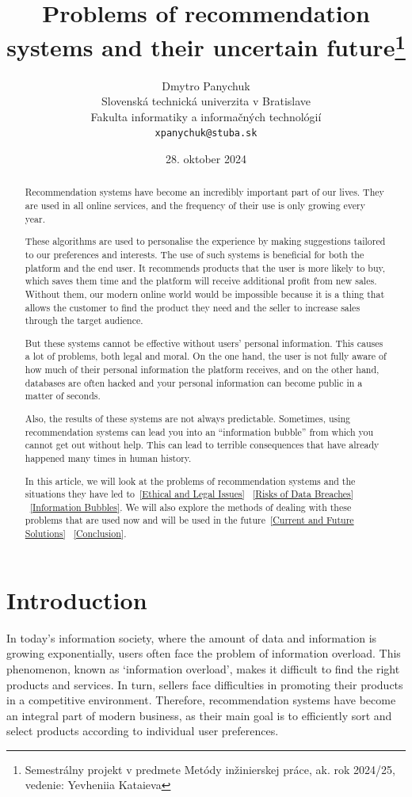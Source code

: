 \documentclass[10pt,twoside,slovak,a4paper]{article}
\title{Problems of recommendation systems and their uncertain future\thanks{Semestrálny projekt v predmete Metódy inžinierskej práce, ak. rok 2024/25, vedenie: Yevheniia Kataieva }}
\author{Dmytro Panychuk\\[2pt]
	{\small Slovenská technická univerzita v Bratislave}\\
	{\small Fakulta informatiky a informačných technológií}\\
	{\small \texttt{xpanychuk@stuba.sk}}
	}
\date{\small 28. oktober 2024}
\begin{document}
\maketitle

\begin{abstract}
\centering


Recommendation systems have become an incredibly important part of our lives. They are used in all online services, and the frequency of their use is only growing every year. 

These algorithms are used to personalise the experience by making suggestions tailored to our preferences and interests\cite{experience}. The use of such systems is beneficial for both the platform and the end user. It recommends products that the user is more likely to buy, which saves them time and the platform will receive additional profit from new sales\cite{comerce}.  Without them, our modern online world would be impossible because it is a thing that allows the customer to find the product they need and the seller to increase sales through the target audience.

But these systems cannot be effective without users' personal information. This causes a lot of problems, both legal and moral. On the one hand, the user is not fully aware of how much of their personal information the platform receives, and on the other hand, databases are often hacked and your personal information can become public in a matter of seconds\cite{zdroj}.

Also, the results of these systems are not always predictable. Sometimes, using recommendation systems can lead you into an “information bubble”\cite{boubble} from which you cannot get out without help. This can lead to terrible consequences that have already happened many times in human history. 

In this article, we will look at the problems of recommendation systems and the situations they have led to~\ref{Ethical and Legal Issues} ~\ref{Risks of Data Breaches} ~\ref{Information Bubbles}. We will also explore the methods of dealing with these problems that are used now and will be used in the future~\ref{Current and Future Solutions} ~\ref{Conclusion}.
\newpage

\end{abstract}



\section{Introduction}
In today's information society, where the amount of data and information is growing exponentially, users often face the problem of information overload\cite{overload}. This phenomenon, known as ‘information overload’, makes it difficult to find the right products and services. In turn, sellers face difficulties in promoting their products in a competitive environment\cite{business}. Therefore, recommendation systems have become an integral part of modern business\cite{comerce}, as their main goal is to efficiently sort and select products according to individual user preferences.
\end{document}
